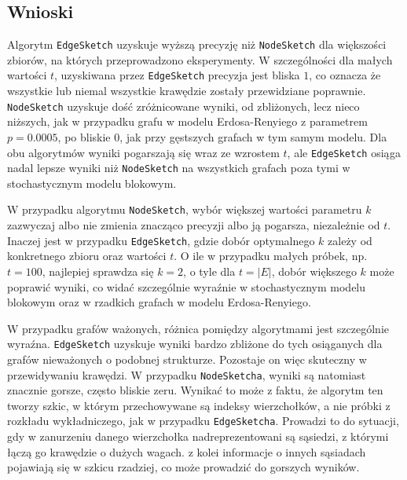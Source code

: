     \subsection{Wnioski}
    Algorytm \texttt{EdgeSketch} uzyskuje wyższą precyzję niż \texttt{NodeSketch} dla większości zbiorów, na których przeprowadzono eksperymenty. W szczególności dla małych wartości $t$, uzyskiwana przez \texttt{EdgeSketch} precyzja jest bliska $1$, co oznacza że wszystkie lub niemal wszystkie krawędzie zostały przewidziane poprawnie. \texttt{NodeSketch} uzyskuje dość zróżnicowane wyniki, od zbliżonych, lecz nieco niższych, jak w przypadku grafu w modelu Erdosa-Renyiego z parametrem $p = 0.0005$, po bliskie $0$, jak przy gęstszych grafach w tym samym modelu. Dla obu algorytmów wyniki pogarszają się wraz ze wzrostem $t$, ale \texttt{EdgeSketch} osiąga nadal lepsze wyniki niż \texttt{NodeSketch} na wszystkich grafach poza tymi w stochastycznym modelu blokowym. 
    
    W przypadku algorytmu \texttt{NodeSketch}, wybór większej wartości parametru $k$ zazwyczaj albo nie zmienia znacząco precyzji albo ją pogarsza, niezależnie od $t$. Inaczej jest w przypadku \texttt{EdgeSketch}, gdzie dobór optymalnego $k$ zależy od konkretnego zbioru oraz wartości $t$. O ile w przypadku małych próbek, np. $t = 100$, najlepiej sprawdza się $k = 2$, o tyle dla $t = |E|$, dobór większego $k$ może poprawić wyniki, co widać szczególnie wyraźnie w stochastycznym modelu blokowym oraz w rzadkich grafach w modelu Erdosa-Renyiego. 

    W przypadku grafów ważonych, różnica pomiędzy algorytmami jest szczególnie wyraźna. \texttt{EdgeSketch} uzyskuje wyniki bardzo zbliżone do tych osiąganych dla grafów nieważonych o podobnej strukturze. Pozostaje on więc skuteczny w przewidywaniu krawędzi. W przypadku \texttt{NodeSketcha}, wyniki są natomiast znacznie gorsze, często bliskie zeru. Wynikać to może z faktu, że algorytm ten tworzy szkic, w którym przechowywane są indeksy wierzchołków, a nie próbki z rozkładu wykładniczego, jak w przypadku \texttt{EdgeSketcha}. Prowadzi to do sytuacji, gdy w zanurzeniu danego wierzchołka nadreprezentowani są sąsiedzi, z którymi łączą go krawędzie o dużych wagach. z kolei informacje o innych sąsiadach pojawiają się w szkicu rzadziej, co może prowadzić do gorszych wyników.

